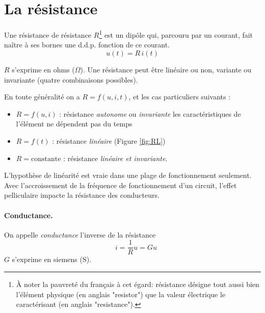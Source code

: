 \section{La résistance}

Une résistance de résistance $R$\footnote{À noter la pauvreté du français à cet égard: résistance désigne tout aussi bien l'élément physique
(en anglais "resistor") que la valeur électrique le caractérisant (en anglais "resistance").} est un dipôle qui, parcouru par un courant, fait
naître à ses bornes une d.d.p. fonction de ce courant. 
\[u(t)=R\, i(t)\]

$R$ s'exprime en ohms ($\Omega$).
Une résistance peut être linéaire ou non, variante ou invariante (quatre combinaisons possibles).

En toute généralité on a $R=f(u,i,t)$, et les cas particuliers suivants : 
\begin{itemize}
	\item $R=f(u,i)$ : résistance {\em autonome} ou {\em invariante}
	les caractéristiques de l'élément ne dépendent pas du temps
	\item $R=f(t)$ : résistance {\em linéaire} (Figure \ref{fig:RL})
	\item $R = \text{constante}$ : résistance {\em linéaire et invariante}.
\end{itemize}

\begin{marginfigure}[2cm]
	\label{fig:RL}
	\centering
	
	\caption{Résistance linéaire. Droite passant par $(0,0)$.
		Pente de la droite = $R$.}
\end{marginfigure}
L'hypothèse de linéarité est vraie  dans une plage de fonctionnement seulement. 
Avec l'accroissement de la fréquence de fonctionnement d'un circuit, l'effet pelliculaire impacte la résistance des conducteurs.

\paragraph{Conductance.}
On appelle \textit{conductance} l'inverse de la résistance
$$\quad i =\frac{1}{R}u=Gu$$
$G$ s'exprime en siemens (S).

